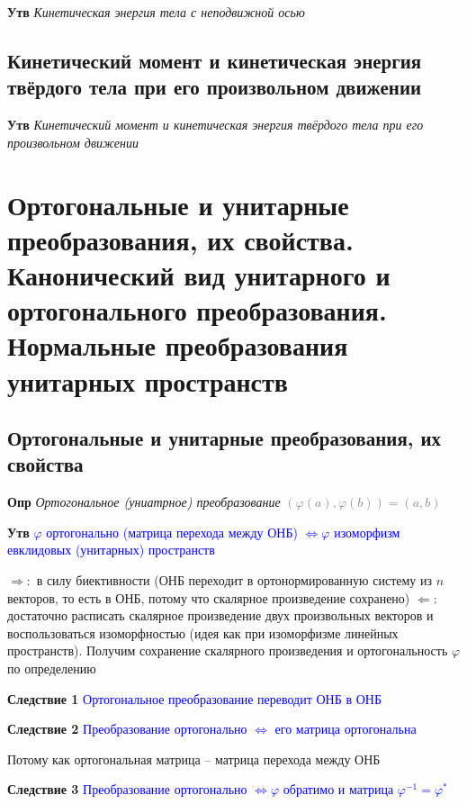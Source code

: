 \documentclass[a4paper, 14pt]{article}
\begin{document}
    \textbf{Утв} \textit{Кинетическая энергия тела с неподвижной осью}
    
    \subsection{Кинетический момент и кинетическая энергия твёрдого тела при его произвольном движении}
    
    \textbf{Утв} \textit{Кинетический момент и кинетическая энергия твёрдого тела при его произвольном движении}
    
    \section{Ортогональные и унитарные преобразования, их свойства.
    Канонический вид унитарного и ортогонального преобразования.
    Нормальные преобразования унитарных пространств}
    
    \subsection{Ортогональные и унитарные преобразования, их свойства}
    
    \textbf{Опр} \textit{Ортогональное (униатрное) преобразование} \textcolor{gray}{$(\varphi (a), \varphi (b)) = (a, b)$}
    
    \textbf{Утв} \textcolor{blue}{$\varphi$ ортогонально (матрица перехода между ОНБ) $\Leftrightarrow \varphi$
        изоморфизм евклидовых (унитарных) пространств}
    
    $\Rightarrow:$ в силу биективности (ОНБ переходит в ортонормированную систему из $n$ векторов, то есть в ОНБ,
    потому что скалярное произведение сохранено)
    $\Leftarrow:$ достаточно расписать скалярное произведение двух произвольных векторов и воспользоваться
    изоморфностью (идея как при изоморфизме линейных пространств).
    Получим сохранение скалярного произведения и ортогональность $\varphi$ по определению
    
    \textbf{Следствие 1} \textcolor{blue}{Ортогональное преобразование переводит ОНБ в ОНБ}
    
    \textbf{Следствие 2} \textcolor{blue}{Преобразование ортогонально $\Leftrightarrow$ его матрица ортогональна}
    
    Потому как ортогональная матрица -- матрица перехода между ОНБ
    
    \textbf{Следствие 3} \textcolor{blue}{Преобразование ортогонально $\Leftrightarrow \varphi$ обратимо и
    матрица $\varphi^{-1} = \varphi^*$}
    
\end{document}

